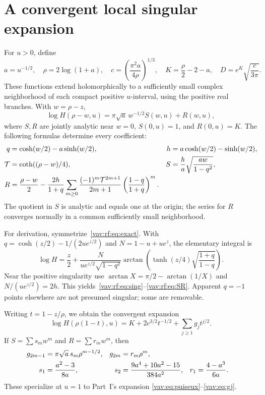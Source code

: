 \documentclass[11pt]{article}
\theoremstyle{remark}\newtheorem{remark}[theorem]{Remark}
\begin{document}
\section{A convergent local singular expansion}\label{vav:rf:sec:singular}
For $u>0$, define
\begin{equation}\label{vav:rf:eq:parameters}
 a=u^{-1/2},\quad \rho=2\log(1+a),\quad
 c=\left(\frac{\pi^2a}{4\rho}\right)^{1/3},\quad
 K=\frac\rho2-2-a,\quad D=e^K\sqrt{\frac{c}{3\pi}}.
\end{equation}
These functions extend holomorphically to a sufficiently small complex neighborhood of each compact positive $u$-interval, using the positive real branches.
With $w=\rho-z$,
\begin{equation}\label{vav:rf:eq:sing}
 \log H(\rho-w,u)=\pi\sqrt a\,w^{-1/2}S(w,u)+R(w,u),
\end{equation}
where $S,R$ are jointly analytic near $w=0$, $S(0,u)=1$, and $R(0,u)=K$.
The following formulas determine every coefficient:
\begin{align}
 q&=\cosh(w/2)-a\sinh(w/2),& h&=a\cosh(w/2)-\sinh(w/2),\notag\\
 \mathcal T&=\coth((\rho-w)/4),& S&=\frac ha\sqrt{\frac{aw}{1-q^2}},\label{vav:rf:eq:SR}\\
 R&=\frac{\rho-w}{2}-\frac{2h}{1+q}
 \sum_{m\ge0}\frac{(-1)^m\mathcal T^{2m+1}}{2m+1}
                 \left(\frac{1-q}{1+q}\right)^m.\notag
\end{align}
The quotient in $S$ is analytic and equals one at the origin; the series for $R$ converges normally in a common sufficiently small neighborhood.

For derivation, symmetrize~\eqref{vav:rf:eq:exact}. With
$q=\cosh(z/2)-1/(2u e^{z/2})$ and $N=1-u+u e^z$, the elementary integral is
\[
 \log H=\frac z2+\frac{N}{u e^{z/2}\sqrt{1-q^2}}
 \arctan\left(\tanh(z/4)\sqrt{\frac{1+q}{1-q}}\right).
\]
Near the positive singularity use $\arctan X=\pi/2-\arctan(1/X)$ and $N/(u e^{z/2})=2h$. This yields~\eqref{vav:rf:eq:sing}--\eqref{vav:rf:eq:SR}. Apparent $q=-1$ points elsewhere are not presumed singular; some are removable.

Writing $t=1-z/\rho$, we obtain the convergent expansion
\begin{equation}\label{vav:rf:eq:puiseux}
 \log H(\rho(1-t),u)=K+2c^{3/2}t^{-1/2}+\sum_{j\ge1}g_jt^{j/2}.
\end{equation}
If $S=\sum s_mw^m$ and $R=\sum r_mw^m$, then
\begin{align}
 g_{2m-1}&=\pi\sqrt a\,s_m\rho^{m-1/2},&g_{2m}&=r_m\rho^m,\notag\\
 s_1&=\frac{a^2-3}{8a},&s_2&=\frac{9a^4+10a^2-15}{384a^2},&r_1&=\frac{4-a^3}{6a}.\label{vav:rf:eq:g}
\end{align}
These specialize at $u=1$ to Part~I's expansion \eqref{vav:eq:puiseux}--\eqref{vav:eq:gj}.
\end{document}
